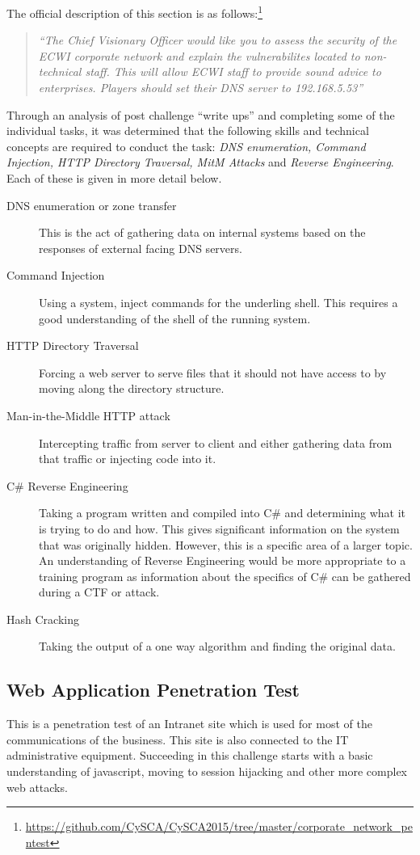 \documentclass[twoside,a4paper,11pt]{report}
\begin{document}
			The official description of this section is as follows:\footnote{\url{https://github.com/CySCA/CySCA2015/tree/master/corporate\_network\_pentest}}
			\begin{quote}
				\textit{``The Chief Visionary Officer would like you to assess the security of the ECWI corporate network and explain the vulnerabilites located to non-technical staff. This will allow ECWI staff to provide sound advice to enterprises. Players should set their DNS server to 192.168.5.53''}
			\end{quote}

			Through an analysis of post challenge ``write ups'' and completing some of the individual tasks, 
			it was determined that the following skills and technical concepts are required to conduct the task: 
			\textit{DNS enumeration, Command Injection, HTTP Directory Traversal, MitM Attacks} and \textit{Reverse Engineering}. 
			Each of these is given in more detail below. 
			\begin{description}
				\item[DNS enumeration or zone transfer]
					This is the act of gathering data on internal systems based on the responses of external facing DNS servers. 
				\item[Command Injection]
					Using a system, inject commands for the underling shell. 
					This requires a good understanding of the shell of the running system. 
				\item[HTTP Directory Traversal]
					Forcing a web server to serve files that it should not have access to by moving along the directory structure.
				\item[Man-in-the-Middle HTTP attack]
					Intercepting traffic from server to client and either gathering data from that traffic or injecting code into it. 
				\item[C\# Reverse Engineering]
					Taking a program written and compiled into C\# and determining what it is trying to do and how. 
					This gives significant information on the system that was originally hidden. 
					However, this is a specific area of a larger topic. 
					An understanding of Reverse Engineering would be more appropriate to a training program as information about the specifics of C\# can be gathered during a CTF or attack. 
				\item[Hash Cracking]
					Taking the output of a one way algorithm and finding the original data. 
			\end{description}
		\subsection{Web Application Penetration Test}
			This is a penetration test of an Intranet site which is used for most of the communications of the business. 
			This site is also connected to the IT administrative equipment. 
			Succeeding in this challenge starts with a basic understanding of javascript, moving to session hijacking and other more complex web attacks. 
			
\end{document}
